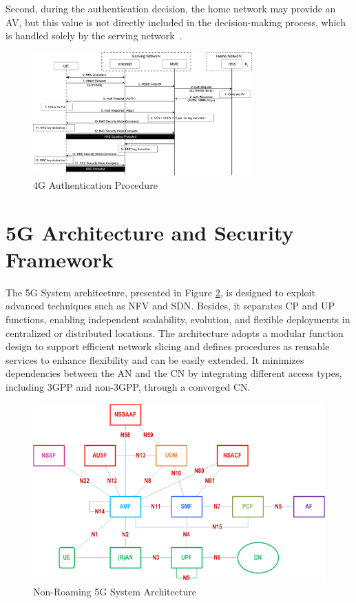 Second, during the authentication decision, the home network may provide an \ac{AV}, but this value is not directly included in the decision-making process, which is handled solely by the serving network~\cite{cbl-comp-p4}.

\begin{figure}[htbp]
    \centering
    \includegraphics[width=0.75\textwidth]{figs/4G-authentication-procedure.png}
    \caption{\ac{4G} Authentication Procedure}
    \label{fig:4G-authentication-procedure}
\end{figure}

\section{\acs{5G} Architecture and Security Framework}

The \ac{5G} System architecture, presented in Figure \ref{fig:5G-system-architecture}, is designed to exploit advanced techniques such as \ac{NFV} and \ac{SDN}. Besides, it separates \ac{CP} and \ac{UP} functions, enabling independent scalability, evolution, and flexible deployments in centralized or distributed locations. The architecture adopts a modular function design to support efficient network slicing and defines procedures as reusable services to enhance flexibility and can be easily extended. It minimizes dependencies between the \ac{AN} and the \ac{CN} by integrating different access types, including \ac{3GPP} and non-\ac{3GPP}, through a converged \ac{CN}.

\begin{figure}
    \centering
    \includegraphics[width=0.75\linewidth]{figs/5g-system-architecture.png}
    \caption{Non-Roaming \acs{5G} System Architecture}
    \label{fig:5G-system-architecture}
\end{figure}

